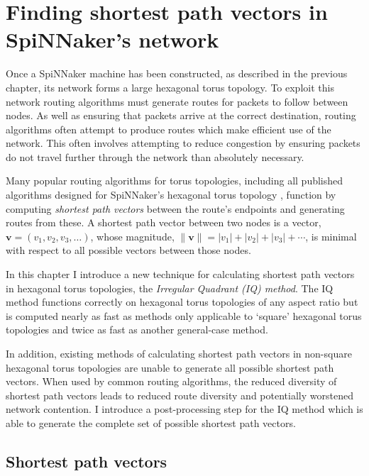 \chapter{Finding shortest path vectors in SpiNNaker's network}
	
	\label{sec:shortestPaths}
	
	
	Once a SpiNNaker machine has been constructed, as described in the previous
	chapter, its network forms a large hexagonal torus topology. To exploit this
	network routing algorithms must generate routes for packets to follow between
	nodes. As well as ensuring that packets arrive at the correct destination,
	routing algorithms often attempt to produce routes which make efficient use
	of the network. This often involves attempting to reduce congestion by
	ensuring packets do not travel further through the network than absolutely
	necessary.
	
	Many popular routing algorithms for torus topologies, including all published
	algorithms designed for SpiNNaker's hexagonal torus topology
	\cite{davies12,navaridas14}, function by computing \emph{shortest path
	vectors} between the route's endpoints and generating routes from these. A
	shortest path vector between two nodes is a vector, $\mathbf{v} = (v_1, v_2,
	v_3, \ldots)$, whose magnitude, $\| \mathbf{v} \| = \lvert v_1 \rvert +
	\lvert v_2 \rvert + \lvert v_3 \rvert + \cdots$, is minimal with respect to
	all possible vectors between those nodes.
	
	In this chapter I introduce a new technique for calculating shortest path
	vectors in hexagonal torus topologies, the \emph{Irregular Quadrant (IQ)
	method}. The IQ method functions correctly on hexagonal torus topologies of
	any aspect ratio but is computed nearly as fast as methods only applicable to
	`square' hexagonal torus topologies and twice as fast as another general-case
	method.
	
	In addition, existing methods of calculating shortest path vectors in
	non-square hexagonal torus topologies are unable to generate all possible
	shortest path vectors. When used by common routing algorithms, the reduced
	diversity of shortest path vectors leads to reduced route diversity and
	potentially worstened network contention. I introduce a post-processing step
	for the IQ method which is able to generate the complete set of possible
	shortest path vectors.
	
	\section{Shortest path vectors}
		
